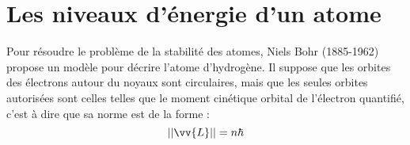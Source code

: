 \documentclass[MPSI]{cours}
\begin{document}







\section{Les niveaux d'énergie d'un atome}
Pour résoudre le problème de la stabilité des atomes, Niels Bohr (1885-1962) propose un modèle pour décrire l'atome d'hydrogène. Il suppose que les orbites des électrons autour du noyaux sont circulaires, mais que les seules orbites autorisées sont celles telles que le moment cinétique orbital de l'électron quantifié, c'est à dire que sa norme est de la forme : 
\begin{equation}
  ||\vv{L}|| = n\hbar
  \label{eq:quantif}
\end{equation}
\end{document}
